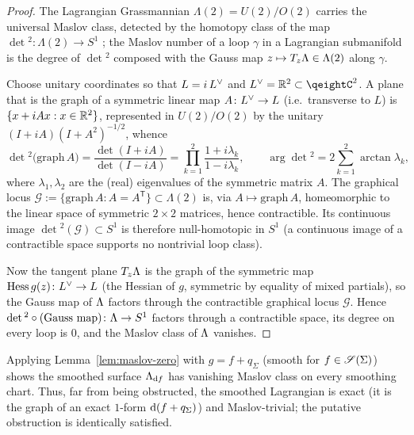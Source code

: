 \begin{proof}
The Lagrangian Grassmannian $\Lambda(2)=U(2)/O(2)$ carries the universal Maslov
class, detected by the homotopy class of the map
$\det{}^2\colon\Lambda(2)\to S^1$ \cite[\S2.3]{McDuffSalamon}; the Maslov number
of a loop $\gamma$ in a Lagrangian submanifold is the degree of $\det{}^2$
composed with the Gauss map $z\mapsto T_z\Lambda\in\Lambda(2)$ along $\gamma$.

Choose unitary coordinates so that $L=i\,L^{\vee}$ and $\qeightLdual=\qeightR^2\subset\qeightC^2$.
A plane that is the graph of a symmetric linear map $A\colon L^{\vee}\to L$ (i.e.\
transverse to $L$) is $\{x+iAx:x\in\mathbb{R}^2\}$, represented in $U(2)/O(2)$ by the
unitary $(I+iA)(I+A^2)^{-1/2}$, whence
\[
\det{}^2\bigl(\mathrm{graph}\,A\bigr)
=\frac{\det(I+iA)}{\det(I-iA)}
=\prod_{k=1}^{2}\frac{1+i\lambda_k}{1-i\lambda_k},
\qquad \arg \det{}^2=2\sum_{k=1}^{2}\arctan\lambda_k,
\]
where $\lambda_1,\lambda_2$ are the (real) eigenvalues of the symmetric matrix
$A$. The graphical locus
$\mathcal G:=\{\mathrm{graph}\,A:A=A^{\mathsf T}\}\subset\Lambda(2)$ is, via
$A\mapsto\mathrm{graph}\,A$, homeomorphic to the linear space of symmetric
$2\times2$ matrices, hence contractible. Its continuous image
$\det{}^2(\mathcal G)\subset S^1$ is therefore null-homotopic in $S^1$ (a
continuous image of a contractible space supports no nontrivial loop class).

Now the tangent plane $T_z\Lambda$ is the graph of the symmetric map
$\operatorname{Hess} g(z)\colon L^{\vee}\to L$ (the Hessian of $g$, symmetric by equality of
mixed partials), so the Gauss map of $\Lambda$ factors through the contractible
graphical locus $\mathcal G$. Hence $\det{}^2\circ(\text{Gauss map})\colon\Lambda\to
S^1$ factors through a contractible space, its degree on every loop is $0$, and the
Maslov class of $\Lambda$ vanishes.
\end{proof}

Applying Lemma~\ref{lem:maslov-zero} with $g=f+q_\Sigma$ (smooth for
$f\in\mathscr S(\Sigma)$) shows the smoothed surface $\Lambda_{\mathrm d f}$ has vanishing Maslov
class on every smoothing chart. Thus, far from being obstructed, the smoothed
Lagrangian is exact (it is the graph of an exact $1$-form $\mathrm d(f+q_\Sigma)$) and
Maslov-trivial; the putative obstruction is identically satisfied.

